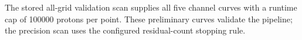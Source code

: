 The stored all-grid validation scan supplies all five channel curves with a runtime cap of \num{100000} protons per point.  These preliminary curves validate the pipeline; the precision scan uses the configured residual-count stopping rule.
